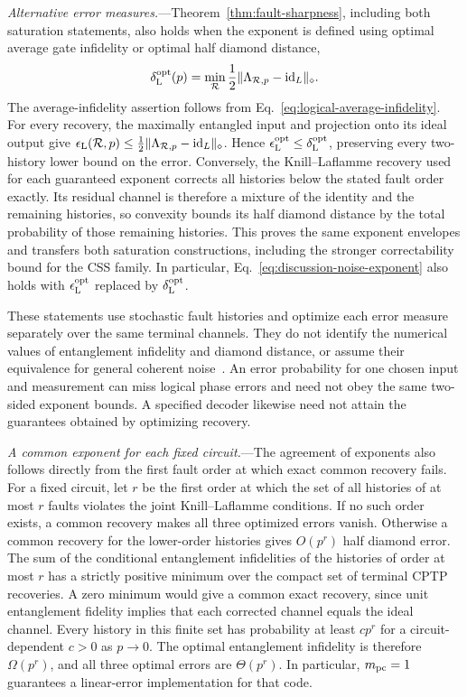 \documentclass[aps,prl,reprint,notitlepage,nofootinbib,nobibnotes]{revtex4-2}
\begin{document}
\emph{Alternative error measures.}---Theorem~\ref{thm:fault-sharpness}, including both saturation
statements, also holds when the exponent is defined using optimal average gate infidelity or
optimal half diamond distance,
\begin{equation}\label{eq:logical-diamond-error}
 \delta_{\rm L}^{\rm opt}(p)
 =\min_{\mathcal R}\frac{1}{2}
   \|\Lambda_{\mathcal R,p}-\mathrm{id}_L\|_\diamond .
\end{equation}
The average-infidelity assertion follows from Eq.~\eqref{eq:logical-average-infidelity}. For every
recovery, the maximally entangled input and projection onto its ideal output give
$\epsilon_{\rm L}(\mathcal R,p)\le
\frac{1}{2}\|\Lambda_{\mathcal R,p}-\mathrm{id}_L\|_\diamond$.
Hence $\epsilon_{\rm L}^{\rm opt}\le\delta_{\rm L}^{\rm opt}$, preserving every two-history lower
bound on the error. Conversely, the Knill--Laflamme recovery used for each guaranteed exponent
corrects all histories below the stated fault order exactly. Its residual channel is therefore a
mixture of the identity and the remaining histories, so convexity bounds its half diamond distance
by the total probability of those remaining histories. This proves the same exponent envelopes and
transfers both saturation constructions, including the stronger correctability bound for the CSS
family. In particular, Eq.~\eqref{eq:discussion-noise-exponent} also holds with $\epsilon_{\rm
L}^{\rm opt}$ replaced by $\delta_{\rm L}^{\rm opt}$.

These statements use stochastic fault histories and optimize each error measure separately over the
same terminal channels. They do not identify the numerical values of entanglement infidelity and
diamond distance, or assume their equivalence for general coherent noise~\cite{KuengMetrics}. An
error probability for one chosen input and measurement can miss logical phase errors and need not
obey the same two-sided exponent bounds. A specified decoder likewise need not attain the
guarantees obtained by optimizing recovery.

\emph{A common exponent for each fixed circuit.}---The agreement of exponents also follows directly
from the first fault order at which exact common recovery fails. For a fixed circuit, let $r$ be
the first order at which the set of all histories of at most $r$ faults violates the joint
Knill--Laflamme conditions. If no such order exists, a common recovery makes all three optimized
errors vanish. Otherwise a common recovery for the lower-order histories gives $O(p^r)$ half
diamond error. The sum of the conditional entanglement infidelities of the histories of order at
most $r$ has a strictly positive minimum over the compact set of terminal CPTP recoveries. A zero
minimum would give a common exact recovery, since unit entanglement fidelity implies that each
corrected channel equals the ideal channel. Every history in this finite set has probability at
least $c p^r$ for a circuit-dependent $c>0$ as $p\to0$. The optimal entanglement infidelity is
therefore $\Omega(p^r)$, and all three optimal errors are $\Theta(p^r)$. In particular, $m_{\rm
pc}=1$ guarantees a linear-error implementation for that code.
\end{document}
